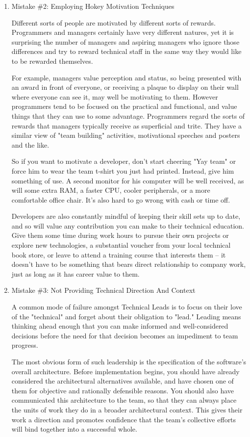 \documentclass{article}
\begin{document}
\begin{enumerate}
\item Mistake \#2: Employing Hokey Motivation Techniques
\label{sec:orgheadline145}

Different sorts of people are motivated by different sorts of rewards.
Programmers and managers certainly have very different natures, yet it
is surprising the number of managers and aspiring managers who ignore
those differences and try to reward technical staff in the same way they
would like to be rewarded themselves.

For example, managers value perception and status, so being presented
with an award in front of everyone, or receiving a plaque to display on
their wall where everyone can see it, may well be motivating to them.
However programmers tend to be focused on the practical and functional,
and value things that they can use to some advantage. Programmers regard
the sorts of rewards that managers typically receive as superficial and
trite. They have a similar view of "team building" activities,
motivational speeches and posters and the like.

So if you want to motivate a developer, don't start cheering "Yay team"
or force him to wear the team t-shirt you just had printed. Instead,
give him something of use. A second monitor for his computer will be
well received, as will some extra RAM, a faster CPU, cooler peripherals,
or a more comfortable office chair. It's also hard to go wrong with cash
or time off.

Developers are also constantly mindful of keeping their skill sets up to
date, and so will value any contribution you can make to their technical
education. Give them some time during work hours to pursue their own
projects or explore new technologies, a substantial voucher from your
local technical book store, or leave to attend a training course that
interests them -- it doesn't have to be something that bears direct
relationship to company work, just as long as it has career value to
them.

\item Mistake \#3: Not Providing Technical Direction And Context
\label{sec:orgheadline146}

A common mode of failure amongst Technical Leads is to focus on their
love of the "technical" and forget about their obligation to "lead."
Leading means thinking ahead enough that you can make informed and
well-considered decisions before the need for that decision becomes an
impediment to team progress.

The most obvious form of such leadership is the specification of the
software's overall architecture. Before implementation begins, you
should have already considered the architectural alternatives available,
and have chosen one of them for objective and rationally defensible
reasons. You should also have communicated this architecture to the
team, so that they can always place the units of work they do in a
broader architectural context. This gives their work a direction and
promotes confidence that the team's collective efforts will bind
together into a successful whole.


\end{enumerate}
\end{document}
